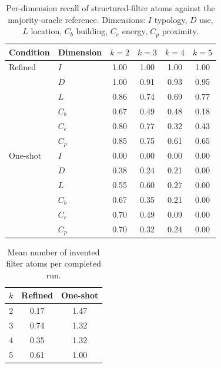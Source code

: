 \documentclass[sigconf,review]{acmart}
\begin{document}
\begin{table}[t]
\caption{Per-dimension recall of structured-filter atoms against the
majority-oracle reference. Dimensions: $I$ typology, $D$ use, $L$
location, $C_b$ building, $C_e$ energy, $C_p$ proximity.}
\label{tab:dimension-recall}
\centering\scriptsize\setlength{\tabcolsep}{5pt}
\begin{tabular}{@{}llcccc@{}}
\toprule
Condition & Dimension & $k=2$ & $k=3$ & $k=4$ & $k=5$\\
\midrule
Refined & $I$ & 1.00 & 1.00 & 1.00 & 1.00\\
 & $D$ & 1.00 & 0.91 & 0.93 & 0.95\\
 & $L$ & 0.86 & 0.74 & 0.69 & 0.77\\
 & $C_b$ & 0.67 & 0.49 & 0.48 & 0.18\\
 & $C_e$ & 0.80 & 0.77 & 0.32 & 0.43\\
 & $C_p$ & 0.85 & 0.75 & 0.61 & 0.65\\
\midrule
One-shot & $I$ & 0.00 & 0.00 & 0.00 & 0.00\\
 & $D$ & 0.38 & 0.24 & 0.21 & 0.00\\
 & $L$ & 0.55 & 0.60 & 0.27 & 0.00\\
 & $C_b$ & 0.67 & 0.35 & 0.21 & 0.00\\
 & $C_e$ & 0.70 & 0.49 & 0.09 & 0.00\\
 & $C_p$ & 0.70 & 0.32 & 0.24 & 0.00\\
\bottomrule
\end{tabular}
\end{table}

\begin{table}[t]
\caption{Mean number of invented filter atoms per completed run.}
\label{tab:invented-atoms}
\centering\scriptsize
\begin{tabular}{@{}rcc@{}}
\toprule
$k$ & Refined & One-shot\\
\midrule
2 & 0.17 & 1.47\\
3 & 0.74 & 1.32\\
4 & 0.35 & 1.32\\
5 & 0.61 & 1.00\\
\bottomrule
\end{tabular}
\end{table}
\end{document}
